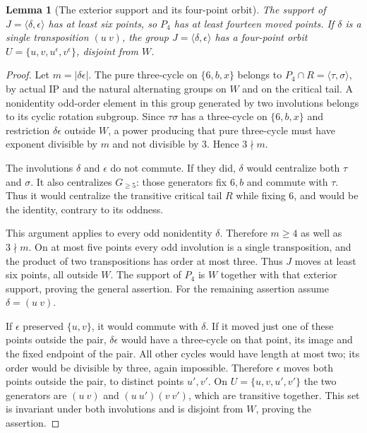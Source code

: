 \documentclass[11pt,a4paper]{article}
\newtheorem{lemma}{Lemma}
\newcommand{\gen}[1]{\langle#1\rangle}
\begin{document}
\begin{lemma}[The exterior support and its four-point orbit]\label{four}
The support of $J=\gen{\delta,\epsilon}$ has at least six points,
so $P_4$ has at least fourteen moved points.
If $\delta$ is a single transposition $(u\ v)$, the group
$J=\gen{\delta,\epsilon}$ has a four-point orbit
$U=\{u,v,u^\epsilon,v^\epsilon\}$, disjoint from $W$.
\end{lemma}
\begin{proof}
Let $m=|\delta\epsilon|$. The pure three-cycle on $\{6,b,x\}$
belongs to $P_4\cap R=\gen{\tau,\sigma}$, by actual IP and
the natural alternating groups on $W$ and on the critical tail.
A nonidentity odd-order element in this group generated by two
involutions belongs to its cyclic rotation subgroup. Since
$\tau\sigma$ has a three-cycle on $\{6,b,x\}$ and restriction
$\delta\epsilon$ outside $W$, a power producing that pure
three-cycle must have exponent divisible by $m$ and not divisible
by $3$. Hence $3\nmid m$.

The involutions $\delta$ and $\epsilon$ do not commute. If they
did, $\delta$ would centralize both $\tau$ and $\sigma$.
It also centralizes $G_{\geq5}$: those generators fix $6,b$
and commute with $\tau$. Thus it would centralize the transitive
critical tail $R$ while fixing $6$, and would be the identity,
contrary to its oddness.

This argument applies to every odd nonidentity $\delta$. Therefore
$m\geq4$ as well as $3\nmid m$. On at most five points every
odd involution is a single transposition, and the product of two
transpositions has order at most three. Thus $J$ moves at least
six points, all outside $W$. The support of $P_4$ is $W$ together
with that exterior support, proving the general assertion.
For the remaining assertion assume $\delta=(u\ v)$.

If $\epsilon$ preserved $\{u,v\}$, it would commute with
$\delta$. If it moved just one of these points outside the
pair, $\delta\epsilon$ would have a three-cycle on that point,
its image and the fixed endpoint of the pair. All other cycles
would have length at most two; its order would be divisible
by three, again impossible. Therefore $\epsilon$ moves both
points outside the pair, to distinct points $u',v'$.
On $U=\{u,v,u',v'\}$ the two generators are
$(u\ v)$ and $(u\ u')(v\ v')$, which are transitive together.
This set is invariant under both involutions and is disjoint
from $W$, proving the assertion.
\end{proof}
\end{document}
